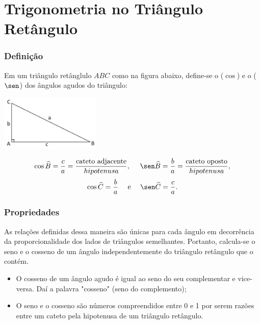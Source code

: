 
\section{Trigonometria no Triângulo Retângulo}
\begin{frame} \frametitle{Definição}
\begin{definicao}
Em um triângulo retânglulo $ABC$ como na figura abaixo, define-se o
 ($\cos$) e o  ($\sen$) dos ângulos agudos do
triângulo:
\begin{center}
\includegraphics[width=4.8cm]{figures/triangret.jpg}
\end{center}
$$\cos \widehat B = \frac c a = \frac {\text{cateto
adjacente}}{hipotenusa}, \ \ \ \ \sen \widehat B = \frac b a = \frac
{\text{cateto oposto}}{hipotenusa},$$
$$\cos \widehat C = \frac b a \ \ \ \ \text{e} \ \ \ \ \sen \widehat
C = \frac c a.$$
\end{definicao}



\end{frame}


\begin{frame}
\frametitle{Propriedades} 
As relações definidas dessa maneira são únicas para cada ângulo em
decorrência da proporcionalidade dos lados de triângulos
semelhantes. Portanto, calcula-se o seno e o cosseno de um ângulo
independentemente do triângulo retângulo que o contém.

\begin{proposicao}
\begin{itemize}
	\item O cosseno de um ângulo agudo é igual ao seno do seu
	complementar e vice-versa. Daí a palavra "cosseno" (seno do
	complemento);
	\item O seno e o cosseno são números compreendidos entre 0 e 1 por
	serem razões entre um cateto pela hipotenusa de um triângulo
	retângulo.
\end{itemize}
\end{proposicao}




\end{frame}

